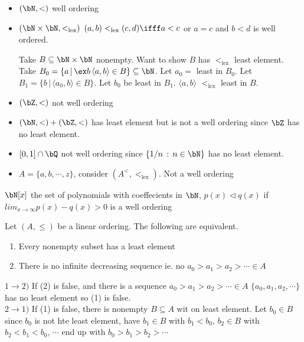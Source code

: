 \begin{example}
    \begin{itemize}
        \item $(\bN, <)$ well ordering 
        \item $(\bN \times \bN, <_{\text{lex}})$ $(a,b) <_{\text{lex}} (c,d) \ifff a < c$ or $a = c$ and $b < d$ is well ordered. 
        \begin{pf}
            Take $B \subseteq \bN \times \bN$ nonempty. Want to show $B$ has $<_{\text{lex}}$ least element. Take $B_0 = \{ a \, | \, \ex b \, \langle a , b \rangle \in B \} \subseteq \bN$. Let $a_0 =$ least in $B_0$. Let $B_1 = \{b \, | \, \langle a_0, b \rangle \in B\}$.  Let $b_0$ be least in $B_1$. $\langle a,b \rangle$ $<_{\text{lex}}$ least in $B$. 
        \end{pf}
        \item $(\bZ, <)$ not well ordering 
        \item $(\bN, <) + (\bZ, <)$ has least element but is not a well ordering since $\bZ$ has no least element. 
        \item $[0,1] \cap \bQ$ not well ordering since $\{1/n \, : \, n \in \bN\}$ has no least element.
        \item $A = \{a, b, \cdots, z\}$, consider $(A^{<}, <_{\text{lex}})$. Not a well ordering  
    \end{itemize}
\end{example}

\begin{example}
    $\bN[x]$ the set of polynomials with coeffecients in $\bN$, $p(x) \triangleleft q(x)$ if $lim_{x \to \infty}p(x) - q(x) >0$ is a well ordering
\end{example}

\begin{lemma}
    Let $(A, \le)$ be a linear ordering. The following are equivalent. 
    \begin{enumerate}
        \item Every nonempty subset has a least element 
        \item There is no infinite decreasing sequence ie. no $a_0 > a_1 > a_2 > \cdots \in A$ 
    \end{enumerate}
\end{lemma}

\begin{pf}
    $1 \to 2)$ If (2) is false, and there is a sequence $a_0 > a_1 > a_2 > \cdots \in A$ $\{a_0, a_1, a_2, \cdots \}$ has no least element so (1) is false. \\
    $2 \to 1)$ If (1) is false, there is nonempty $B \subseteq A$ wit on least element. Let $b_0 \in B$ since $b_0$ is not hte least element, have $b_1 \in B$ with $b_1 < b_0$, $b_2 \in B$ with $b_2 < b_1 < b_0$, $\cdots$ end up with $b_0 > b_1 > b_2 > \cdots$ 
\end{pf}